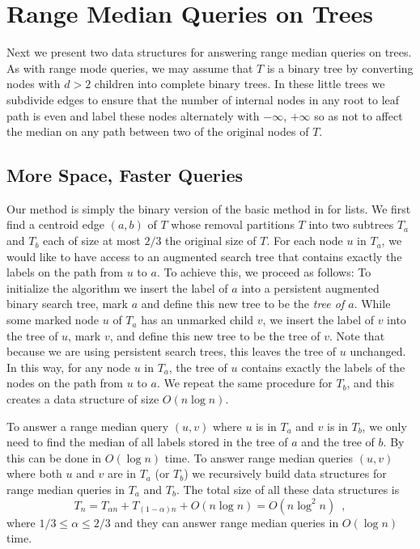 \documentclass{njcarticle}
\begin{document}
\section{Range Median Queries on Trees}

Next we present two data structures for answering range median queries
on trees.  As with range mode queries, we may assume that $T$ is a
binary tree by converting nodes with $d>2$ children into complete
binary trees.  In these little trees we subdivide edges to ensure that
the number of internal nodes in any root to leaf path is even and
label these nodes alternately with $-\infty$, $+\infty$ so as not
to affect the median on any path between two of the original nodes of
$T$.

\subsection{More Space, Faster Queries}

Our method is simply the binary version of the basic method in
 for lists.  We first find a centroid edge
$(a,b)$ of $T$ whose removal partitions $T$ into two subtrees $T_a$
and $T_b$ each of size at most $2/3$ the original size of $T$.  For
each node $u$ in $T_a$, we would like to have access to an augmented
search tree that contains exactly the labels on the path from $u$ to
$a$.  To achieve this, we proceed as follows: To initialize the
algorithm we insert the label of $a$ into a persistent augmented
binary search tree, mark $a$ and define this new tree to be the
\emph{tree of $a$}.  While some marked node $u$ of $T_a$ has an
unmarked child $v$, we insert the label of $v$ into the tree of $u$,
mark $v$, and define this new tree to be the tree of $v$.  Note that
because we are using persistent search trees, this leaves the tree of
$u$ unchanged.  In this way, for any node $u$ in $T_a$, the tree of
$u$ contains exactly the labels of the nodes on the path from $u$ to
$a$.  We repeat the same procedure for $T_b$, and this creates a data
structure of size $O(n\log n)$.

To answer a range median query $(u,v)$ where $u$ is in $T_a$ and $v$
is in $T_b$, we only need to find the median of all labels stored in
the tree of $a$ and the tree of $b$.  By 
this can be done in $O(\log n)$ time.  To answer range median queries
$(u,v)$ where both $u$ and $v$ are in $T_a$ (or $T_b$) we recursively
build data structures for range median queries in $T_a$ and $T_b$.
The total size of all these data structures is \[  T_n = T_{\alpha n}
+ T_{(1-\alpha)n} + O(n\log n) = O(n\log^2 n) \enspace ,\] where
$1/3\le\alpha\le 2/3$ and they can answer range median queries in
$O(\log n)$ time.
\end{document}
